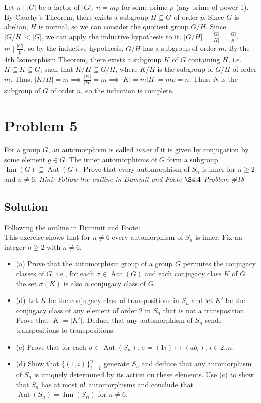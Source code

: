\documentclass[fleqn]{article}
\DeclareMathOperator{\Aut}{Aut}
\DeclareMathOperator{\Inn}{Inn}
\begin{document}
        Let $n \mid |G|$ be a factor of $|G|$.  $n = mp$ for some prime $p$ (any prime of power 1).  By Cauchy's Theorem, there exists a subgroup $H \subseteq G$ of order $p$.  Since $G$ is abelian, $H$ is normal, so we can consider the quotient group $G/H$.  Since $|G/H| < |G|$, we can apply the inductive hypothesis to it.  $|G/H| = \frac{|G|}{|H|} = \frac{|G|}{p}$.  $m \mid \frac{|G|}{p}$, so by the inductive hypothesis, $G/H$ has a subgroup of order $m$.  By the 4th Isomorphism Theorem, there exists a subgroup $K$ of $G$ containing $H$, i.e. $H \subseteq K \subseteq G$, such that $K/H \subseteq G/H$, where $K/H$ is the subgroup of $G/H$ of order $m$.  Thus, $|K/H| = m \implies \frac{|K|}{|H|} = m \implies |K| = m|H| = mp = n$.  Thus, $N$ is the subgroup of $G$ of order $n$, so the induction is complete.
    
    \section{Problem 5}
    For a group $G$, an automorphism is called \textit{inner} if it is given by conjugation by some element $g \in G$.  The inner automorphisms of $G$ form a subgroup $\Inn(G) \subseteq \Aut(G)$.  Prove that every automorphism of $S_n$ is inner for $n \geq 2$ and $n \neq 6$.  \textit{Hint: Follow the outline in Dummit and Foote $\S4.4$ Problem \#18}
        
        \subsection{Solution}
        Following the outline in Dummit and Foote: \\
        $ $ \\
        \noindent
        This exercise shows that for $n \neq 6$ every automorphism of $S_n$ is inner.  Fix an integer $n \geq 2$ with $n \neq 6$.
        \begin{itemize}
            \item (a) Prove that the automorphism group of a group $G$ permutes the conjugacy classes of $G$, i.e., for each $\sigma \in \Aut(G)$ and each conjugacy class $K$ of $G$ the set $\sigma(K)$ is also a conjugacy class of $G$.
            \item (d) Let $K$ be the conjugacy class of transpositions in $S_n$ and let $K'$ be the conjugacy class of any element of order 2 in $S_n$ that is not a transposition.  Prove that $|K| = |K'|$.  Deduce that any automorphism of $S_n$ sends transpositions to transpositions.
            \item (c) Prove that for each $\sigma \in \Aut(S_n)$, $\sigma = (1 i) \mapsto (a b_i)$, $i \in 2..n$.
            \item (d) Show that $\{(1, i)\}_{i = 1}^n$ generate $S_n$ and deduce that any automorphism of $S_n$ is uniquely determined by its action on these elements.  Use (c) to show that $S_n$ has at most $n!$ automorphisms and conclude that $\Aut(S_n) = \Inn(S_n)$ for $n \neq 6$.
        \end{itemize}
        
\end{document}
